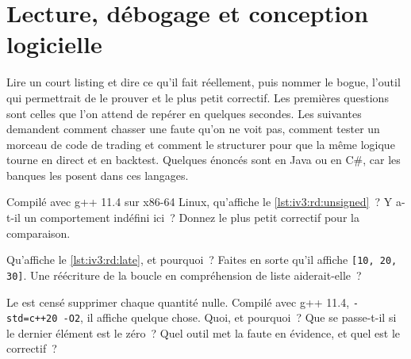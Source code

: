 \chapter{Lecture, débogage et conception logicielle}\label{ch:iv3:reading-debugging-and-software-design}

\begin{ivtrains}
Lire un court listing et dire ce qu'il fait réellement, puis nommer le bogue, l'outil qui permettrait de le prouver et le plus petit correctif. Les premières questions sont celles que l'on attend de repérer en quelques secondes. Les suivantes demandent comment chasser une faute qu'on ne voit pas, comment tester un morceau de code de trading et comment le structurer pour que la même logique tourne en direct et en backtest. Quelques énoncés sont en Java ou en C\#, car les banques les posent dans ces langages.
\end{ivtrains}

\begin{question}\label{iq:iv3:reading-debugging-and-software-design:1}
Compilé avec g++ 11.4 sur x86-64 Linux, qu'affiche le \cref{lst:iv3:rd:unsigned}~? Y a-t-il un comportement indéfini ici~? Donnez le plus petit correctif pour la comparaison.
\label{lst:iv3:rd:unsigned}
\end{question}

\begin{question}\label{iq:iv3:reading-debugging-and-software-design:2}
Qu'affiche le \cref{lst:iv3:rd:late}, et pourquoi~? Faites en sorte qu'il affiche \texttt{[10, 20, 30]}. Une réécriture de la boucle en compréhension de liste aiderait-elle~?
\label{lst:iv3:rd:late}
\end{question}

\begin{question}\label{iq:iv3:reading-debugging-and-software-design:3}
Le  est censé supprimer chaque quantité nulle. Compilé avec g++ 11.4, \texttt{-std=c++20 -O2}, il affiche quelque chose. Quoi, et pourquoi~? Que se passe-t-il si le dernier élément est le zéro~? Quel outil met la faute en évidence, et quel est le correctif~?
\label{lst:iv3:rd:erase}
\end{question}

